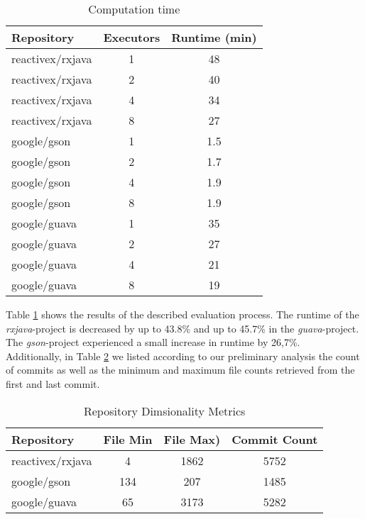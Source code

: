 \documentclass[conference]{IEEEtran}
\begin{document}
\begin{table}[htbp]
\caption{Computation time}
\begin{center}
\begin{tabular}{|l|c|c|}
\hline
\textbf{Repository} & \textbf{Executors}& \textbf{Runtime (min)}\\
\hline
reactivex/rxjava& 1 & 48\\\cline{2-3}
reactivex/rxjava& 2 & 40\\\cline{2-3}
reactivex/rxjava& 4 & 34\\\cline{2-3}
reactivex/rxjava& 8 & 27\\
\hline
google/gson& 1 & 1.5\\\cline{2-3}
google/gson& 2 & 1.7\\\cline{2-3}
google/gson& 4 & 1.9\\\cline{2-3}
google/gson& 8 & 1.9\\
\hline
google/guava& 1 & 35\\\cline{2-3}
google/guava& 2 & 27\\\cline{2-3}
google/guava& 4 & 21\\\cline{2-3}
google/guava& 8 & 19\\
\hline
\end{tabular}
\label{tab1}
\end{center}
\end{table}

Table \ref{tab1} shows the results of the described evaluation process. The runtime of the \emph{rxjava}-project is decreased by up to 43.8\% and up to 45.7\% in the \emph{guava}-project. The \emph{gson}-project experienced a small increase in runtime by 26,7\%.\\
Additionally, in Table \ref{tab2} we listed according to our preliminary analysis the count of commits as well as the minimum and maximum file counts retrieved from the first and last commit. 

\begin{table}[htbp]
\caption{Repository Dimsionality Metrics}
\begin{center}
\begin{tabular}{|l|c|c|c|}
\hline
\textbf{Repository} & \textbf{File Min}& \textbf{File Max)}&\textbf{Commit Count}\\
\hline
reactivex/rxjava& 4 & 1862 & 5752\\
\hline
google/gson& 134 & 207 & 1485\\
\hline
google/guava& 65 & 3173 & 5282\\
\hline
\end{tabular}
\label{tab2}
\end{center}
\end{table}
\end{document}
